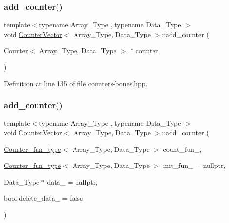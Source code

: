 \subsubsection{\texorpdfstring{add\+\_\+counter()}{add\_counter()}\hspace{0.1cm}{\footnotesize\ttfamily [2/3]}}
{\footnotesize\ttfamily template$<$typename Array\+\_\+\+Type , typename Data\+\_\+\+Type $>$ \\
void \hyperlink{class_counter_vector}{Counter\+Vector}$<$ Array\+\_\+\+Type, Data\+\_\+\+Type $>$\+::add\+\_\+counter (\begin{DoxyParamCaption}\item[{\hyperlink{class_counter}{Counter}$<$ Array\+\_\+\+Type, Data\+\_\+\+Type $>$ $\ast$}]{counter }\end{DoxyParamCaption})\hspace{0.3cm}{\ttfamily [inline]}}



Definition at line 135 of file counters-\/bones.\+hpp.

\mbox{\label{class_counter_vector_adb32ff1af45bc05a292a5cb064dc414d}} 
\subsubsection{\texorpdfstring{add\+\_\+counter()}{add\_counter()}\hspace{0.1cm}{\footnotesize\ttfamily [3/3]}}
{\footnotesize\ttfamily template$<$typename Array\+\_\+\+Type , typename Data\+\_\+\+Type $>$ \\
void \hyperlink{class_counter_vector}{Counter\+Vector}$<$ Array\+\_\+\+Type, Data\+\_\+\+Type $>$\+::add\+\_\+counter (\begin{DoxyParamCaption}\item[{\hyperlink{typedefs_8hpp_ac0160f52f564dea3ac033b374cffbfe7}{Counter\+\_\+fun\+\_\+type}$<$ Array\+\_\+\+Type, Data\+\_\+\+Type $>$}]{count\+\_\+fun\+\_\+,  }\item[{\hyperlink{typedefs_8hpp_ac0160f52f564dea3ac033b374cffbfe7}{Counter\+\_\+fun\+\_\+type}$<$ Array\+\_\+\+Type, Data\+\_\+\+Type $>$}]{init\+\_\+fun\+\_\+ = {\ttfamily nullptr},  }\item[{Data\+\_\+\+Type $\ast$}]{data\+\_\+ = {\ttfamily nullptr},  }\item[{bool}]{delete\+\_\+data\+\_\+ = {\ttfamily false} }\end{DoxyParamCaption})\hspace{0.3cm}{\ttfamily [inline]}}



